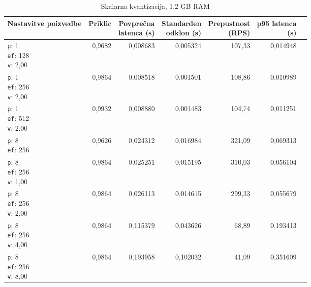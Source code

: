 \begin{table}[htbp]
  \centering
\small
  \caption{Skalarna kvantizacija, 1,2 GB RAM}
  \label{tab:single-2cpu-1.2ram:sq:qdrant-dipl-baseline-tenant-subgraph-sq-ext-m16-ef-128-random-768-100-tenants-extended-upload-2026-08-19-00-22-58.json}
  \begin{tabularx}{\textwidth}{Xrrrrrr}
    \toprule
    Nastavitve poizvedbe & Priklic & \makecell{Povprečna\\latenca (s)} & \makecell{Standarden\\odklon (s)} & \makecell{Prepustnost\\(RPS)} & \makecell{p95 latenca\\(s)}  \\
    \midrule
    \makecell{\texttt{p}: 1\\\texttt{ef}: 128\\\texttt{v}: 2,00} & 0,9682 & 0,008683 & 0,005324 & 107,33 & 0,014948 \\
    \makecell{\texttt{p}: 1\\\texttt{ef}: 256\\\texttt{v}: 2,00} & 0,9864 & 0,008518 & 0,001501 & 108,86 & 0,010989 \\
    \makecell{\texttt{p}: 1\\\texttt{ef}: 512\\\texttt{v}: 2,00} & 0,9932 & 0,008880 & 0,001483 & 104,74 & 0,011251 \\
    \makecell{\texttt{p}: 8\\\texttt{ef}: 256} & 0,9626 & 0,024312 & 0,016984 & 321,09 & 0,069313 \\
    \makecell{\texttt{p}: 8\\\texttt{ef}: 256\\\texttt{v}: 1,00} & 0,9864 & 0,025251 & 0,015195 & 310,03 & 0,056104 \\
    \makecell{\texttt{p}: 8\\\texttt{ef}: 256\\\texttt{v}: 2,00} & 0,9864 & 0,026113 & 0,014615 & 299,33 & 0,055679 \\
    \makecell{\texttt{p}: 8\\\texttt{ef}: 256\\\texttt{v}: 4,00} & 0,9864 & 0,115379 & 0,043626 & 68,89 & 0,193413 \\
    \makecell{\texttt{p}: 8\\\texttt{ef}: 256\\\texttt{v}: 8,00} & 0,9864 & 0,193958 & 0,102032 & 41,09 & 0,351609 \\

\end{tabularx}
\end{table}
